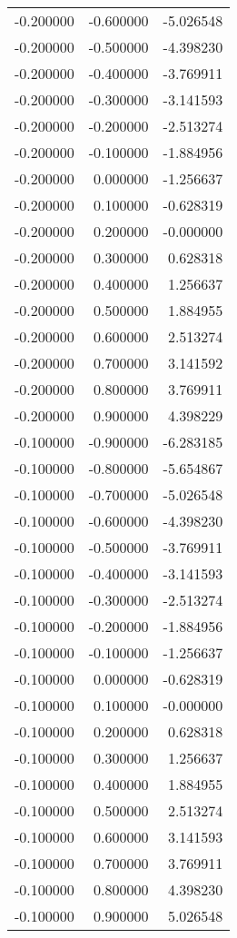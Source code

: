 \begin{tabular}{rrr}
-0.200000 & -0.600000 & -5.026548 \\
-0.200000 & -0.500000 & -4.398230 \\
-0.200000 & -0.400000 & -3.769911 \\
-0.200000 & -0.300000 & -3.141593 \\
-0.200000 & -0.200000 & -2.513274 \\
-0.200000 & -0.100000 & -1.884956 \\
-0.200000 & 0.000000 & -1.256637 \\
-0.200000 & 0.100000 & -0.628319 \\
-0.200000 & 0.200000 & -0.000000 \\
-0.200000 & 0.300000 & 0.628318 \\
-0.200000 & 0.400000 & 1.256637 \\
-0.200000 & 0.500000 & 1.884955 \\
-0.200000 & 0.600000 & 2.513274 \\
-0.200000 & 0.700000 & 3.141592 \\
-0.200000 & 0.800000 & 3.769911 \\
-0.200000 & 0.900000 & 4.398229 \\
-0.100000 & -0.900000 & -6.283185 \\
-0.100000 & -0.800000 & -5.654867 \\
-0.100000 & -0.700000 & -5.026548 \\
-0.100000 & -0.600000 & -4.398230 \\
-0.100000 & -0.500000 & -3.769911 \\
-0.100000 & -0.400000 & -3.141593 \\
-0.100000 & -0.300000 & -2.513274 \\
-0.100000 & -0.200000 & -1.884956 \\
-0.100000 & -0.100000 & -1.256637 \\
-0.100000 & 0.000000 & -0.628319 \\
-0.100000 & 0.100000 & -0.000000 \\
-0.100000 & 0.200000 & 0.628318 \\
-0.100000 & 0.300000 & 1.256637 \\
-0.100000 & 0.400000 & 1.884955 \\
-0.100000 & 0.500000 & 2.513274 \\
-0.100000 & 0.600000 & 3.141593 \\
-0.100000 & 0.700000 & 3.769911 \\
-0.100000 & 0.800000 & 4.398230 \\
-0.100000 & 0.900000 & 5.026548 \\

\end{tabular}
